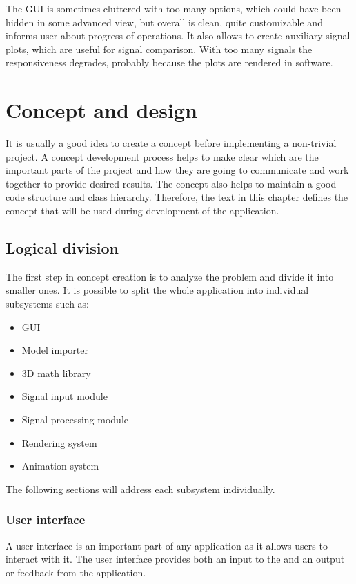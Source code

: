 The GUI is sometimes cluttered with too many options, which could have been
hidden in some advanced view, but overall is clean, quite customizable and
informs user about progress of operations. It also allows to create auxiliary
signal plots, which are useful for signal comparison. With too many signals
the responsiveness degrades, probably because the plots are rendered in software.

\chapter{Concept and design} \label{concept}
It is usually a good idea to create a concept before implementing a non-trivial project. A concept development process helps to make clear which are the important parts of the project and how they are going to communicate and work together to provide desired results. The concept also helps to maintain a good code structure and class hierarchy. Therefore, the text in this chapter defines the concept that will be used during development of the application.

\section{Logical division}
The first step in concept creation is to analyze the problem and divide it into smaller ones. It is possible to split the whole application into individual subsystems such as:
\begin{itemize}
	\item GUI
	\item Model importer
	\item 3D math library 
	\item Signal input module
	\item Signal processing module
	\item Rendering system
	\item Animation system
\end{itemize}

The following sections will address each subsystem individually.
\subsection{User interface}
A user interface is an important part of any application as it allows users to interact with it. The user interface provides both an input to the and an output or feedback from the application.

